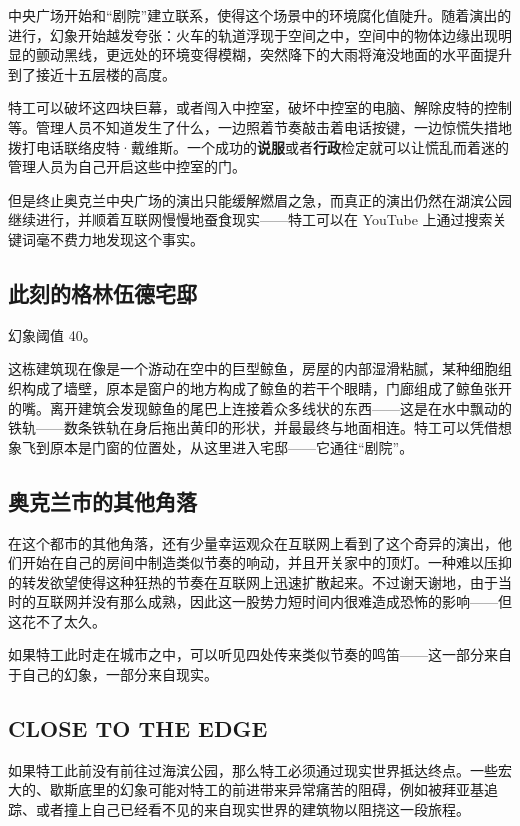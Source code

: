 中央广场开始和“剧院”建立联系，使得这个场景中的环境腐化值陡升。随着演出的进行，幻象开始越发夸张：火车的轨道浮现于空间之中，空间中的物体边缘出现明显的颤动黑线，更远处的环境变得模糊，突然降下的大雨将淹没地面的水平面提升到了接近十五层楼的高度。

特工可以破坏这四块巨幕，或者闯入中控室，破坏中控室的电脑、解除皮特的控制等。管理人员不知道发生了什么，一边照着节奏敲击着电话按键，一边惊慌失措地拨打电话联络皮特·戴维斯。一个成功的\textbf{说服}或者\textbf{行政}检定就可以让慌乱而着迷的管理人员为自己开启这些中控室的门。

但是终止奥克兰中央广场的演出只能缓解燃眉之急，而真正的演出仍然在湖滨公园继续进行，并顺着互联网慢慢地蚕食现实——特工可以在 YouTube 上通过搜索关键词毫不费力地发现这个事实。

\subsection{此刻的格林伍德宅邸}

幻象阈值 40。

这栋建筑现在像是一个游动在空中的巨型鲸鱼，房屋的内部湿滑粘腻，某种细胞组织构成了墙壁，原本是窗户的地方构成了鲸鱼的若干个眼睛，门廊组成了鲸鱼张开的嘴。离开建筑会发现鲸鱼的尾巴上连接着众多线状的东西——这是在水中飘动的铁轨——数条铁轨在身后拖出黄印的形状，并最最终与地面相连。特工可以凭借想象飞到原本是门窗的位置处，从这里进入宅邸——它通往“剧院”。

\subsection{奥克兰市的其他角落}

在这个都市的其他角落，还有少量幸运观众在互联网上看到了这个奇异的演出，他们开始在自己的房间中制造类似节奏的响动，并且开关家中的顶灯。一种难以压抑的转发欲望使得这种狂热的节奏在互联网上迅速扩散起来。不过谢天谢地，由于当时的互联网并没有那么成熟，因此这一股势力短时间内很难造成恐怖的影响——但这花不了太久。

如果特工此时走在城市之中，可以听见四处传来类似节奏的鸣笛——这一部分来自于自己的幻象，一部分来自现实。

\subsection{CLOSE TO THE EDGE}

如果特工此前没有前往过海滨公园，那么特工必须通过现实世界抵达终点。一些宏大的、歇斯底里的幻象可能对特工的前进带来异常痛苦的阻碍，例如被拜亚基追踪、或者撞上自己已经看不见的来自现实世界的建筑物以阻挠这一段旅程。

